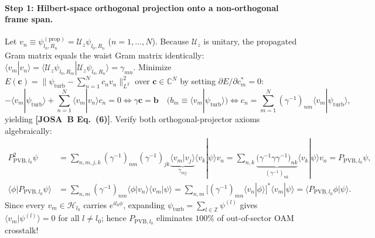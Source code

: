 \documentclass[10pt,letterpaper]{article}
\newcommand{\braket}[2]{\langle #1 | #2 \rangle}
\newcommand{\norm}[1]{\lVert #1 \rVert}
\newcommand{\josb}[1]{\textbf{[JOSA~B Eq.~(#1)]}}
\numberwithin{equation}{section}
\begin{document}
\paragraph*{Step 1: Hilbert-space orthogonal projection onto a non-orthogonal frame span.}
Let $v_n \equiv \psi_{l_0,R_n}^{(\mathrm{prop})} = \mathcal{U}_z\psi_{l_0,R_n}$ ($n = 1,\dots,N$). Because $\mathcal{U}_z$ is unitary, the propagated Gram matrix equals the waist Gram matrix identically: $\braket{v_m}{v_n} = \braket{\mathcal{U}_z\psi_{l_0,R_m}}{\mathcal{U}_z\psi_{l_0,R_n}} = \gamma_{mn}$. Minimize $E(\mathbf{c}) = \norm{\psi_{\mathrm{turb}} - \sum_{n=1}^N c_n v_n}_{L^2}^2$ over $\mathbf{c} \in \mathbb{C}^N$ by setting $\partial E/\partial c_m^* = 0$:
\begin{equation}
  -\braket{v_m}{\psi_{\mathrm{turb}}} + \sum_{n=1}^N \braket{v_m}{v_n} c_n = 0 \iff \gamma\mathbf{c} = \mathbf{b}\quad (b_m \equiv \braket{v_m}{\psi_{\mathrm{turb}}}) \iff c_n = \sum_{m=1}^N (\gamma^{-1})_{nm}\braket{v_m}{\psi_{\mathrm{turb}}},
\end{equation}
yielding \josb{6}. Verify both orthogonal-projector axioms algebraically:
\begin{align}
  P_{\mathrm{PVB},l_0}^2\psi &= \sum_{n,m,j,k} (\gamma^{-1})_{nm}(\gamma^{-1})_{jk}\underbrace{\braket{v_m}{v_j}}_{\gamma_{mj}}\braket{v_k}{\psi}v_n = \sum_{n,k}\underbrace{\bigl(\gamma^{-1}\gamma\gamma^{-1}\bigr)_{nk}}_{(\gamma^{-1})_{nk}}\braket{v_k}{\psi}v_n = P_{\mathrm{PVB},l_0}\psi, \\
  \braket{\phi}{P_{\mathrm{PVB},l_0}\psi} &= \sum_{n,m}(\gamma^{-1})_{nm}\braket{\phi}{v_n}\braket{v_m}{\psi} = \sum_{n,m}\bigl[(\gamma^{-1})_{mn}\braket{v_n}{\phi}\bigr]^*\braket{v_m}{\psi} = \braket{P_{\mathrm{PVB},l_0}\phi}{\psi}.
\end{align}
Since every $v_m \in \mathcal{H}_{l_0}$ carries $e^{il_0\phi}$, expanding $\psi_{\mathrm{turb}} = \sum_{l\in\mathbb{Z}}\psi^{(l)}$ gives $\braket{v_m}{\psi^{(l)}} = 0$ for all $l \neq l_0$; hence $P_{\mathrm{PVB},l_0}$ eliminates $100\%$ of out-of-sector OAM crosstalk!
\end{document}
